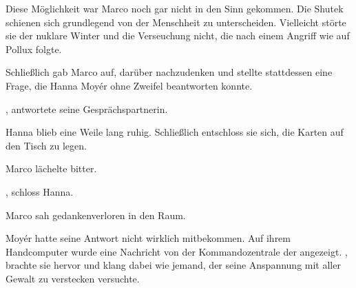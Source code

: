 \par

Diese Möglichkeit war Marco noch gar nicht in den Sinn gekommen. Die Shutek schienen sich grundlegend von der Menschheit zu unterscheiden. Vielleicht störte sie der nuklare Winter und die Verseuchung nicht, die nach einem Angriff wie auf Pollux folgte.

\par

Schließlich gab Marco auf, darüber nachzudenken und stellte stattdessen eine Frage, die Hanna Moyér ohne Zweifel beantworten konnte. 

\par

, antwortete seine Gesprächspartnerin. 

\par


\par

Hanna blieb eine Weile lang ruhig. Schließlich entschloss sie sich, die Karten auf den Tisch zu legen. 

\par

Marco lächelte bitter. 

\par

, schloss Hanna.

\par

Marco sah gedankenverloren in den Raum. 

\par

Moyér hatte seine Antwort nicht wirklich mitbekommen. Auf ihrem Handcomputer wurde eine Nachricht von der Kommandozentrale der  angezeigt. , brachte sie hervor und klang dabei wie jemand, der seine Anspannung mit aller Gewalt zu verstecken versuchte. 

